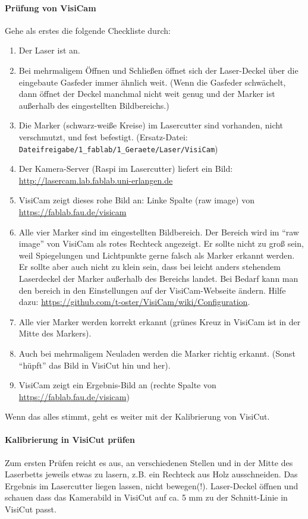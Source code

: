\documentclass{\basedir/fablab-document}
\begin{document}
	\paragraph{Prüfung von VisiCam} Gehe als erstes die folgende Checkliste durch:
	\begin{enumerate}
		\item Der Laser ist an.
		\item Bei mehrmaligem Öffnen und Schließen öffnet sich der Laser-Deckel über die eingebaute Gasfeder immer ähnlich weit. (Wenn die Gasfeder schwächelt, dann öffnet der Deckel manchmal nicht weit genug und der Marker ist außerhalb des eingestellten Bildbereichs.)
		\item Die Marker (schwarz-weiße Kreise) im Lasercutter sind vorhanden, nicht verschmutzt, und fest befestigt. (Ersatz-Datei: \verb|Dateifreigabe/1_fablab/1_Geraete/Laser/VisiCam|)
		\item Der Kamera-Server (Raspi im Lasercutter) liefert ein Bild: \url{http://lasercam.lab.fablab.uni-erlangen.de}
		\item VisiCam zeigt dieses rohe Bild an: Linke Spalte (raw image) von \url{https://fablab.fau.de/visicam}
		\item Alle vier Marker sind im eingestellten Bildbereich. Der Bereich wird im \enquote{raw image} von VisiCam als rotes Rechteck angezeigt. Er sollte nicht zu groß sein, weil Spiegelungen und Lichtpunkte gerne falsch als Marker erkannt werden. Er sollte aber auch nicht zu klein sein, dass bei leicht anders stehendem Laserdeckel der Marker außerhalb des Bereichs landet. Bei Bedarf kann man den bereich in den Einstellungen auf der VisiCam-Webseite ändern. Hilfe dazu: \url{https://github.com/t-oster/VisiCam/wiki/Configuration}.
		\item Alle vier Marker werden korrekt erkannt (grünes Kreuz in VisiCam ist in der Mitte des Markers).
		\item Auch bei mehrmaligem Neuladen werden die Marker richtig erkannt. (Sonst \enquote{hüpft} das Bild in VisiCut hin und her).
		\item VisiCam zeigt ein Ergebnis-Bild an (rechte Spalte von \url{https://fablab.fau.de/visicam})
	\end{enumerate}
	Wenn das alles stimmt, geht es weiter mit der Kalibrierung von VisiCut.

	\paragraph{Kalibrierung in VisiCut prüfen}
	Zum ersten Prüfen reicht es aus, an verschiedenen Stellen und in der Mitte des Laserbetts jeweils etwas zu lasern, z.B. ein Rechteck aus Holz ausschneiden. Das Ergebnis im Lasercutter liegen lassen, nicht bewegen(!). Laser-Deckel öffnen und schauen dass das Kamerabild in VisiCut auf ca. 5 mm zu der Schnitt-Linie in VisiCut passt.
\end{document}

